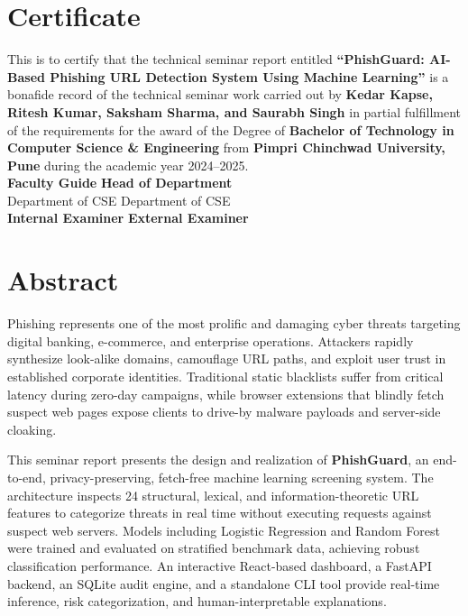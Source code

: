 \documentclass[12pt,a4paper]{report}
\begin{document}
\chapter*{Certificate}
\thispagestyle{empty}
\noindent This is to certify that the technical seminar report entitled \textbf{``PhishGuard: AI-Based Phishing URL Detection System Using Machine Learning''} is a bonafide record of the technical seminar work carried out by \textbf{Kedar Kapse, Ritesh Kumar, Saksham Sharma, and Saurabh Singh} in partial fulfillment of the requirements for the award of the Degree of \textbf{Bachelor of Technology in Computer Science \& Engineering} from \textbf{Pimpri Chinchwad University, Pune} during the academic year 2024--2025.
\\[0.8in]

\noindent
\textbf{Faculty Guide} \hfill \textbf{Head of Department} \\
Department of CSE \hfill Department of CSE \\[0.6in]

\noindent
\textbf{Internal Examiner} \hfill \textbf{External Examiner}

\chapter*{Abstract}
Phishing represents one of the most prolific and damaging cyber threats targeting digital banking, e-commerce, and enterprise operations. Attackers rapidly synthesize look-alike domains, camouflage URL paths, and exploit user trust in established corporate identities. Traditional static blacklists suffer from critical latency during zero-day campaigns, while browser extensions that blindly fetch suspect web pages expose clients to drive-by malware payloads and server-side cloaking.

This seminar report presents the design and realization of \textbf{PhishGuard}, an end-to-end, privacy-preserving, fetch-free machine learning screening system. The architecture inspects 24 structural, lexical, and information-theoretic URL features to categorize threats in real time without executing requests against suspect web servers. Models including Logistic Regression and Random Forest were trained and evaluated on stratified benchmark data, achieving robust classification performance. An interactive React-based dashboard, a FastAPI backend, an SQLite audit engine, and a standalone CLI tool provide real-time inference, risk categorization, and human-interpretable explanations.
\end{document}
